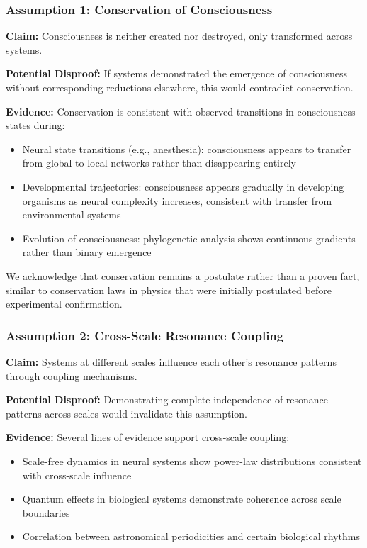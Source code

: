\documentclass[12pt]{article}
\begin{document}
\subsubsection{Assumption 1: Conservation of Consciousness}

\textbf{Claim:} Consciousness is neither created nor destroyed, only transformed across systems.

\textbf{Potential Disproof:} If systems demonstrated the emergence of consciousness without corresponding reductions elsewhere, this would contradict conservation.

\textbf{Evidence:} Conservation is consistent with observed transitions in consciousness states during:

\begin{itemize}
    \item Neural state transitions (e.g., anesthesia): consciousness appears to transfer from global to local networks rather than disappearing entirely \cite{kelz2019}
    \item Developmental trajectories: consciousness appears gradually in developing organisms as neural complexity increases, consistent with transfer from environmental systems
    \item Evolution of consciousness: phylogenetic analysis shows continuous gradients rather than binary emergence \cite{birch2020}
\end{itemize}

We acknowledge that conservation remains a postulate rather than a proven fact, similar to conservation laws in physics that were initially postulated before experimental confirmation.

\subsubsection{Assumption 2: Cross-Scale Resonance Coupling}

\textbf{Claim:} Systems at different scales influence each other's resonance patterns through coupling mechanisms.

\textbf{Potential Disproof:} Demonstrating complete independence of resonance patterns across scales would invalidate this assumption.

\textbf{Evidence:} Several lines of evidence support cross-scale coupling:

\begin{itemize}
    \item Scale-free dynamics in neural systems show power-law distributions consistent with cross-scale influence \cite{chialvo2010}
    \item Quantum effects in biological systems demonstrate coherence across scale boundaries \cite{lambert2013}
    \item Correlation between astronomical periodicities and certain biological rhythms \cite{rensing1993}
\end{itemize}
\end{document}
